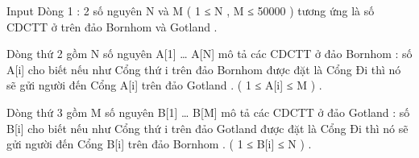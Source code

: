 Input
Dòng 1 : 2 số nguyên N và M ( 1 ≤ N , M ≤ 50000 ) tương ứng là số CDCTT ở trên đảo Bornhom và Gotland .


Dòng thứ 2 gồm N số nguyên A[1] … A[N] mô tả các CDCTT ở đảo Bornhom : số A[i] cho biết nếu như Cổng thứ i trên đảo Bornhom được đặt là Cổng Đi thì nó sẽ gửi người đến Cổng A[i] trên đảo Gotland . ( 1 ≤ A[i] ≤ M ) .


Dòng thứ 3 gồm M số nguyên B[1] … B[M] mô tả các CDCTT ở đảo Gotland : số B[i] cho biết nếu như Cổng thứ i trên đảo Gotland được đặt là Cổng Đi thì nó sẽ gửi người đến Cổng B[i] trên đảo Bornhom . ( 1 ≤ B[i] ≤ N ) .